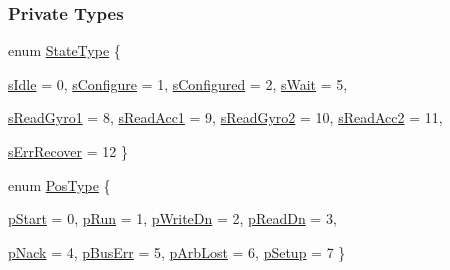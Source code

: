 \subsubsection*{Private Types}
\begin{DoxyCompactItemize}
\item 
enum \hyperlink{class_i_m_u_a7b5e1bf1cf1407b3e4cf0dd2e18b523f}{StateType} \{ \par
\hyperlink{class_i_m_u_a7b5e1bf1cf1407b3e4cf0dd2e18b523fa82181a217d68f26cba06b38cfb94c1bc}{sIdle} =  0, 
\hyperlink{class_i_m_u_a7b5e1bf1cf1407b3e4cf0dd2e18b523fae3a15f0845da0f426c48b6bd9ed01b21}{sConfigure} =  1, 
\hyperlink{class_i_m_u_a7b5e1bf1cf1407b3e4cf0dd2e18b523fa98a87654cac5bbc7d12c9701563dbae5}{sConfigured} =  2, 
\hyperlink{class_i_m_u_a7b5e1bf1cf1407b3e4cf0dd2e18b523fa4d7c7afff1b740c59d740b9b77a8d18c}{sWait} =  5, 
\par
\hyperlink{class_i_m_u_a7b5e1bf1cf1407b3e4cf0dd2e18b523fa8f3b3efb815c4ee9396ccb1fda939f77}{sReadGyro1} =  8, 
\hyperlink{class_i_m_u_a7b5e1bf1cf1407b3e4cf0dd2e18b523fa7e6ba39651fb8aca4abcdf80ed789d8b}{sReadAcc1} =  9, 
\hyperlink{class_i_m_u_a7b5e1bf1cf1407b3e4cf0dd2e18b523fa2e538ebe471a9482d15ab162ec3bdc6d}{sReadGyro2} =  10, 
\hyperlink{class_i_m_u_a7b5e1bf1cf1407b3e4cf0dd2e18b523fa4d82e2432f2e2075cef6143740c4df59}{sReadAcc2} =  11, 
\par
\hyperlink{class_i_m_u_a7b5e1bf1cf1407b3e4cf0dd2e18b523fae27080f67607320b8cc57d8402a07277}{sErrRecover} =  12
 \}
\item 
enum \hyperlink{class_i_m_u_ad01128d82debc1e4213affe4858f3144}{PosType} \{ \par
\hyperlink{class_i_m_u_ad01128d82debc1e4213affe4858f3144a1d2d6c166c92bec6d19b37a6dbeeaf8c}{pStart} =  0, 
\hyperlink{class_i_m_u_ad01128d82debc1e4213affe4858f3144a9cb1b471b394a5a3a87c6bab61ae00e4}{pRun} =  1, 
\hyperlink{class_i_m_u_ad01128d82debc1e4213affe4858f3144ac2332a4383aa00818b3fc4ed83ec1f4d}{pWriteDn} =  2, 
\hyperlink{class_i_m_u_ad01128d82debc1e4213affe4858f3144a1b257baca1eb9eb3e7192a01770cce76}{pReadDn} =  3, 
\par
\hyperlink{class_i_m_u_ad01128d82debc1e4213affe4858f3144ac361e1f3b3b93592825ae06da0309c62}{pNack} =  4, 
\hyperlink{class_i_m_u_ad01128d82debc1e4213affe4858f3144a3db70da4b0066e7738bed5e25f4fc405}{pBusErr} =  5, 
\hyperlink{class_i_m_u_ad01128d82debc1e4213affe4858f3144a5b061676aa01e1049ff07e5a191c9af8}{pArbLost} =  6, 
\hyperlink{class_i_m_u_ad01128d82debc1e4213affe4858f3144a73419f05716e41c972241a4fc0c6ead0}{pSetup} =  7
 \}
\item 

\end{DoxyCompactItemize}
